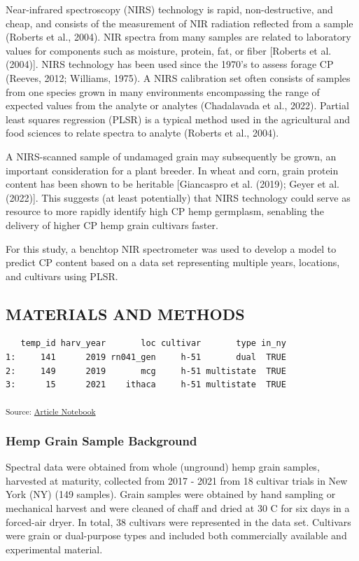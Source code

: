\documentclass[
]{agujournal2019}
\begin{document}
Near-infrared spectroscopy (NIRS) technology is rapid, non-destructive,
and cheap, and consists of the measurement of NIR radiation reflected
from a sample (Roberts et al., 2004). NIR spectra from many samples are
related to laboratory values for components such as moisture, protein,
fat, or fiber {[}Roberts et al. (2004){]}. NIRS technology has been used
since the 1970's to assess forage CP (Reeves, 2012; Williams, 1975). A
NIRS calibration set often consists of samples from one species grown in
many environments encompassing the range of expected values from the
analyte or analytes (Chadalavada et al., 2022). Partial least squares
regression (PLSR) is a typical method used in the agricultural and food
sciences to relate spectra to analyte (Roberts et al., 2004).

A NIRS-scanned sample of undamaged grain may subsequently be grown, an
important consideration for a plant breeder. In wheat and corn, grain
protein content has been shown to be heritable {[}Giancaspro et al.
(2019); Geyer et al. (2022){]}. This suggests (at least potentially)
that NIRS technology could serve as resource to more rapidly identify
high CP hemp germplasm, senabling the delivery of higher CP hemp grain
cultivars faster.

For this study, a benchtop NIR spectrometer was used to develop a model
to predict CP content based on a data set representing multiple years,
locations, and cultivars using PLSR.

\subsection{MATERIALS AND METHODS}\label{materials-and-methods}

\begin{verbatim}
   temp_id harv_year       loc cultivar       type in_ny
1:     141      2019 rn041_gen     h-51       dual  TRUE
2:     149      2019       mcg     h-51 multistate  TRUE
3:      15      2021    ithaca     h-51 multistate  TRUE
\end{verbatim}

\textsubscript{Source:
\href{https://rvcrawford.github.io/glowing-system/index.qmd.html}{Article
Notebook}}

\subsubsection{Hemp Grain Sample
Background}\label{hemp-grain-sample-background}

Spectral data were obtained from whole (unground) hemp grain samples,
harvested at maturity, collected from 2017 - 2021 from 18 cultivar
trials in New York (NY) (149 samples). Grain samples were obtained by
hand sampling or mechanical harvest and were cleaned of chaff and dried
at 30 C for six days in a forced-air dryer. In total, 38 cultivars were
represented in the data set. Cultivars were grain or dual-purpose types
and included both commercially available and experimental material.
\end{document}
